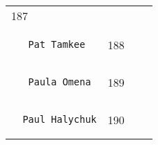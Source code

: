 \documentclass[]{article}
\begin{document}
\begin{longtable}[c]{@{}llll@{}}
\begin{minipage}[t]{0.10\columnwidth}
187
\end{minipage} & \begin{minipage}[t]{0.13\columnwidth}\raggedright
\end{minipage} & \begin{minipage}[t]{0.15\columnwidth}\raggedright
\end{minipage}
\\\noalign{\medskip}
\begin{minipage}[t]{0.39\columnwidth}\raggedright
\begin{verbatim}
   Pat Tamkee
\end{verbatim}
\end{minipage} & \begin{minipage}[t]{0.10\columnwidth}\raggedright
188
\end{minipage} & \begin{minipage}[t]{0.13\columnwidth}\raggedright
\end{minipage} & \begin{minipage}[t]{0.15\columnwidth}\raggedright
\end{minipage}
\\\noalign{\medskip}
\begin{minipage}[t]{0.39\columnwidth}\raggedright
\begin{verbatim}
   Paula Omena
\end{verbatim}
\end{minipage} & \begin{minipage}[t]{0.10\columnwidth}\raggedright
189
\end{minipage} & \begin{minipage}[t]{0.13\columnwidth}\raggedright
\end{minipage} & \begin{minipage}[t]{0.15\columnwidth}\raggedright
\end{minipage}
\\\noalign{\medskip}
\begin{minipage}[t]{0.39\columnwidth}\raggedright
\begin{verbatim}
  Paul Halychuk
\end{verbatim}
\end{minipage} & \begin{minipage}[t]{0.10\columnwidth}\raggedright
190
\end{minipage} & \begin{minipage}[t]{0.13\columnwidth}\raggedright
\end{minipage} & \begin{minipage}[t]{0.15\columnwidth}\raggedright

\end{minipage}
\end{longtable}
\end{document}
